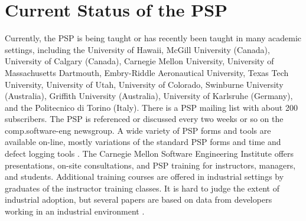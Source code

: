 \section{Current Status of the PSP}
Currently, the PSP is being taught or has recently been taught in many
academic settings, including the University of Hawaii, McGill University
(Canada), University of Calgary (Canada), Carnegie Mellon University,
University of Massachusetts Dartmouth, Embry-Riddle Aeronautical
University, Texas Tech University, University of Utah, University of
Colorado, Swinburne University (Australia), Griffith University
(Australia), University of Karlsruhe (Germany), and the Politecnico di
Torino (Italy).  There is a PSP mailing list with about 200 subscribers.
The PSP is referenced or discussed every two weeks or so on the
comp.software-eng newsgroup.  A wide variety of PSP forms and tools are
available on-line, mostly variations of the standard PSP forms and time and
defect logging tools \cite{Resources98}. The Carnegie Mellon Software
Engineering Institute offers presentations, on-site consultations, and PSP
training for instructors, managers, and students.  Additional training
courses are offered in industrial settings by graduates of the instructor
training classes. It is hard to judge the extent of industrial adoption,
but several papers are based on data from developers working in an
industrial environment \cite{Ferguson97} \cite{CMU97} \cite{Dellien97}
\cite{Kness97} \cite{Shostak96}.


